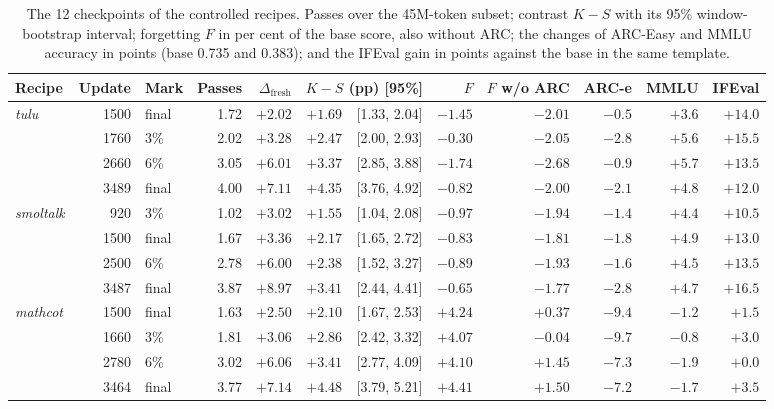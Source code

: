 \documentclass[11pt,a4paper]{article}
\theoremstyle{definition}
\newcommand{\dfresh}{\Delta_{\mathrm{fresh}}}
\newcommand{\KS}{$K\!-\!S$}
\newcommand{\tulu}{\textit{tulu}}
\newcommand{\smoltalk}{\textit{smoltalk}}
\newcommand{\mathcot}{\textit{mathcot}}
\begin{document}
\begin{table}[ht]
\centering\footnotesize
\caption{The 12 checkpoints of the controlled recipes. Passes over the 45M-token subset; contrast \KS{} with its
95\% window-bootstrap interval; forgetting $F$ in per cent of the base score, also without ARC; the changes of
ARC-Easy and MMLU accuracy in points (base 0.735 and 0.383); and the IFEval gain in points against the base in the
same template.}
\label{tab:matched}
\begin{tabular}{@{}l r l r r r c r r r r r@{}}
\toprule
Recipe & Update & Mark & Passes & $\dfresh$ & \multicolumn{2}{c}{\KS{} (pp) [95\%]} & $F$ & $F$ w/o ARC & ARC-e &
MMLU & IFEval \\
\midrule
\tulu & 1500 & final & 1.72 & $+2.02$ & $+1.69$ & [1.33, 2.04] & $-1.45$ & $-2.01$ & $-0.5$ & $+3.6$ & $+14.0$ \\
 & 1760 & 3\% & 2.02 & $+3.28$ & $+2.47$ & [2.00, 2.93] & $-0.30$ & $-2.05$ & $-2.8$ & $+5.6$ & $+15.5$ \\
 & 2660 & 6\% & 3.05 & $+6.01$ & $+3.37$ & [2.85, 3.88] & $-1.74$ & $-2.68$ & $-0.9$ & $+5.7$ & $+13.5$ \\
 & 3489 & final & 4.00 & $+7.11$ & $+4.35$ & [3.76, 4.92] & $-0.82$ & $-2.00$ & $-2.1$ & $+4.8$ & $+12.0$ \\
\smoltalk & 920 & 3\% & 1.02 & $+3.02$ & $+1.55$ & [1.04, 2.08] & $-0.97$ & $-1.94$ & $-1.4$ & $+4.4$ & $+10.5$ \\
 & 1500 & final & 1.67 & $+3.36$ & $+2.17$ & [1.65, 2.72] & $-0.83$ & $-1.81$ & $-1.8$ & $+4.9$ & $+13.0$ \\
 & 2500 & 6\% & 2.78 & $+6.00$ & $+2.38$ & [1.52, 3.27] & $-0.89$ & $-1.93$ & $-1.6$ & $+4.5$ & $+13.5$ \\
 & 3487 & final & 3.87 & $+8.97$ & $+3.41$ & [2.44, 4.41] & $-0.65$ & $-1.77$ & $-2.8$ & $+4.7$ & $+16.5$ \\
\mathcot & 1500 & final & 1.63 & $+2.50$ & $+2.10$ & [1.67, 2.53] & $+4.24$ & $+0.37$ & $-9.4$ & $-1.2$ & $+1.5$ \\
 & 1660 & 3\% & 1.81 & $+3.06$ & $+2.86$ & [2.42, 3.32] & $+4.07$ & $-0.04$ & $-9.7$ & $-0.8$ & $+3.0$ \\
 & 2780 & 6\% & 3.02 & $+6.06$ & $+3.41$ & [2.77, 4.09] & $+4.10$ & $+1.45$ & $-7.3$ & $-1.9$ & $+0.0$ \\
 & 3464 & final & 3.77 & $+7.14$ & $+4.48$ & [3.79, 5.21] & $+4.41$ & $+1.50$ & $-7.2$ & $-1.7$ & $+3.5$ \\
\bottomrule
\end{tabular}
\end{table}
\end{document}
